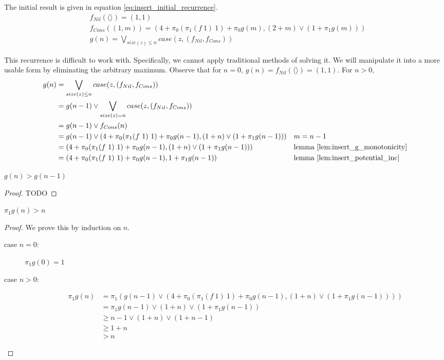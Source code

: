 The initial result is given in equation \ref{eq:insert_initial_recurrence}.
\begin{align}
  &f_{Nil}(\langle\rangle) = (1,1) \\ 
  &f_{Cons}((1,m)) = (4 + \pi_0(\pi_1(f\ 1)\ 1) + \pi_0g(m), (2+m) \vee (1+\pi_1g(m))) \\ 
  \label{eq:insert_initial_recurrence}
  &g(n) = \bigvee_{size(z) \leq n} case(z, (f_{Nil},f_{Cons}))
\end{align}

This recurrence is difficult to work with.
Specifically, we cannot apply traditional methods of solving it.
We will manipulate it into a more usable form by eliminating the arbitrary maximum.
Observe that for $n=0$, $g(n) = f_{Nil}(\langle\rangle) = (1,1)$.
For $n>0$, 
\begin{align*}
  g(n) &= \bigvee_{size(z) \leq n} case(z, (f_{Nil},f_{Cons})) &&\\ 
  &= g(n-1) \vee \bigvee_{size(z) = n} case(z, (f_{Nil},f_{Cons})) &&\\
  &= g(n-1) \vee f_{Cons}(n) &&\\
  &= g(n-1) \vee (4 + \pi_0(\pi_1(f\ 1)\ 1) + \pi_0g(n-1), (1+n) \vee (1+\pi_1g(n-1))) &&\text{$m=n-1$}\\ 
  &= (4 + \pi_0(\pi_1(f\ 1)\ 1) + \pi_0g(n-1), (1+n) \vee (1+\pi_1g(n-1))) &&\text{lemma \ref{lem:insert_g_monotonicity}}\\ 
  &= (4 + \pi_0(\pi_1(f\ 1)\ 1) + \pi_0g(n-1), 1+\pi_1g(n-1)) &&\text{lemma \ref{lem:insert_potential_inc}}
\end{align*}
\begin{lemma}
  \label{lem:insert_g_monotonicity}
  $g(n) > g(n-1)$
\end{lemma}
\begin{proof}
  TODO
\end{proof}

\begin{lemma}
\label{lem:insert_potential_inc}
$\pi_1 g(n) > n$
\end{lemma}
\begin{proof}
We prove this by induction on $n$.
\begin{description}
  \item[case $n=0$:] $\pi_1g(0) = 1$
  \item[case $n>0$:]\hfill
    \begin{align*}
      \pi_1g(n) &= \pi_1(g(n-1) \vee (4 + \pi_0(\pi_1(f\ 1)\ 1) + \pi_0g(n-1),(1+n) \vee (1 + \pi_1 g(n-1)))) \\
      &= \pi_1g(n-1) \vee (1+n) \vee (1 + \pi_1 g(n-1)) \\
      &\geq n-1 \vee (1+n) \vee (1 + n - 1) \\
      &\geq 1+n \\
      &> n
    \end{align*}
\end{description}
\end{proof}

